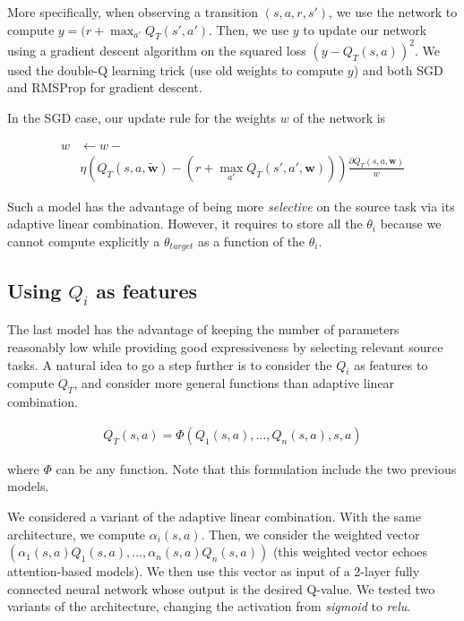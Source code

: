 \documentclass{article}
\begin{document}
More specifically, when observing a transition $(s,a,r,s')$, we use the network to compute $  y = (r + \max_{a'} Q_{T}(s', a') $. Then, we use $ y $ to update our network using a gradient descent algorithm on the squared loss $ (y - Q_{T}(s,a))^2 $. We used the double-Q learning trick (use old weights to compute $ y $) and both SGD and RMSProp for gradient descent.

In the SGD case, our update rule for the weights $ w $ of the network is

\begin{equation}
\begin{split}
w &\leftarrow w - \\
&\eta \left(Q_{T}(s,a, \mathbf{\tilde{w}}) - (r + \max_{a'} Q_{T}(s', a', \mathbf{w})) \right)\frac{\partial Q_{T}(s,a, \mathbf{w})}{w}
\end{split}
\end{equation}



Such a model has the advantage of being more \textit{selective} on the source task via its adaptive linear combination. However, it requires to store all the $\theta_i$ because we cannot compute explicitly a $ \theta_{target} $ as a function of the $ \theta_i $.

\subsection{Using $ Q_i$ as features}
\label{sec:qfeatures}

The last model has the advantage of keeping the number of parameters reasonably low while providing good expressiveness by selecting relevant source tasks. A natural idea to go a step further is to consider the $ Q_i $ as features to compute $Q_{T} $, and consider more general functions than adaptive linear combination.

\begin{align}
Q_{T}(s,a) = \Phi(Q_1(s,a), ..., Q_n(s,a), s, a)
\end{align}

where $\Phi $ can be any function. Note that this formulation include the two previous models. 

We considered a variant of the adaptive linear combination. With the same architecture, we compute $ \alpha_i (s, a) $. Then, we consider the weighted vector $ ( \alpha_1 (s,a) Q_1(s,a), ..., \alpha_n(s,a)Q_n(s,a) )$ (this weighted vector echoes attention-based models). We then use this vector as input of a 2-layer fully connected neural network whose output is the desired Q-value. We tested two variants of the architecture, changing the activation from \textit{sigmoid} to \textit{relu}.
\end{document}

